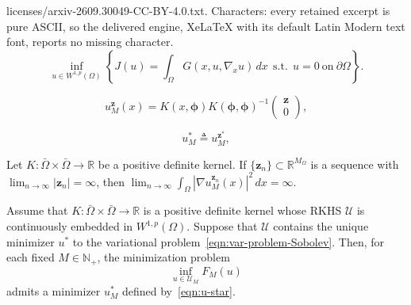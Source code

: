 \documentclass[10pt,a4paper]{amsart}
\begin{document}
licenses/arxiv-2609.30049-CC-BY-4.0.txt. Characters: every retained excerpt is pure ASCII, so the delivered engine, XeLaTeX with its default Latin Modern text font, reports no missing character.
\begin{equation}
  \label{eqn:var-problem-Sobolev}
  \inf_{u \in W^{1, p}(\Omega)} \left\{J(u) = \int_{\Omega} G(x, u, \nabla_x u)\, dx ~~\text{s.t.}~~ u = 0 ~\text{on}~\partial \Omega\right\}.
\end{equation}

\begin{equation}\label{eqn:uz}
  u_M^{\boldsymbol{z}}(x) = K(x, \boldsymbol{\phi})K(\boldsymbol{\phi}, \boldsymbol{\phi})^{-1}\begin{pmatrix}
    \boldsymbol{z}\\ 0
  \end{pmatrix},
\end{equation}

\begin{equation}\label{eqn:u-star}
u_M^* \triangleq u_M^{\boldsymbol{z}^*},
\end{equation}

\begin{lemma}\label{lem:quadratic-estimate}
Let 
$K: \bar{\Omega} \times \bar{\Omega} \to \mathbb{R}$ be
a positive definite kernel.
If $\{\boldsymbol{z}_n \}\subset \mathbb{R}^{M_{\Omega}}$ is a sequence with $\lim_{n \to \infty}|\boldsymbol{z}_n| = \infty$, then
$
\lim_{n \to \infty}\int_{\Omega} \left|\nabla u_M^{\boldsymbol{z}_n}(x)\right|^2 \, dx = \infty .
$
\end{lemma}

\begin{theorem}
Assume that
  $K: \bar{\Omega} \times \bar{\Omega} \to \mathbb{R}$ is a positive
  definite kernel whose RKHS $\mathcal{U}$ is continuously embedded in
  $W^{1, p}(\Omega)$. 
  Suppose that  $\mathcal{U}$ contains the unique minimizer $u^*$ to the
    variational problem~\eqref{eqn:var-problem-Sobolev}.
  Then, for each fixed $M \in \mathbb{N}_+$, the
  minimization problem
  \begin{equation}
    \label{eqn:var_JM}
    \inf_{u \in \mathcal{U}_M} F_M(u)
  \end{equation}
  admits a minimizer $u_M^*$ defined by~\eqref{eqn:u-star}.
\end{theorem}
\end{document}
